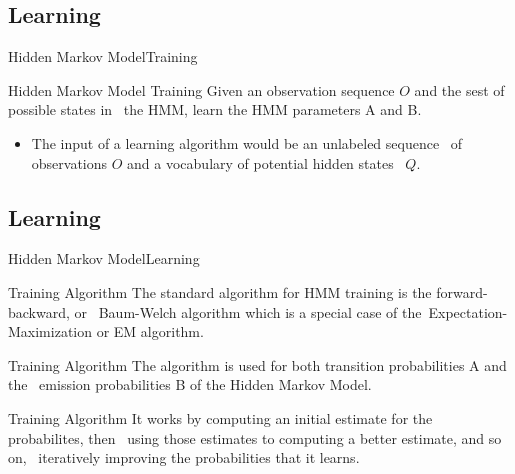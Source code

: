 \documentclass[10pt]{beamer}
\begin{document}
\subsection{Learning}
\begin{frame}{Hidden Markov Model}{Training}
    \begin{block}{Hidden Markov Model Training}
       Given an observation sequence $O$ and the sest of possible states in \
       the HMM, learn the HMM parameters A and B.
    \end{block}
    
    \begin{itemize}
       \item The input of a learning algorithm would be an unlabeled sequence \
             of observations $O$ and a vocabulary of potential hidden states \
             $Q$.
    \end{itemize}

\end{frame}

\subsection{Learning}
\begin{frame}{Hidden Markov Model}{Learning}
    \begin{block}{Training Algorithm}
        The standard algorithm for HMM training is the forward-backward, or \
        Baum-Welch algorithm which is a special case of the\
        Expectation-Maximization or EM algorithm.
    \end{block}
    \begin{block}{Training Algorithm}
        The algorithm is used for both transition probabilities A and the \
        emission probabilities B of the Hidden Markov Model.
    \end{block}
    \begin{block}{Training Algorithm}
        It works by computing an initial estimate for the probabilites, then \
        using those estimates to computing a better estimate, and so on, \
        iteratively improving the probabilities that it learns.
    \end{block}
\end{frame}
\end{document}
